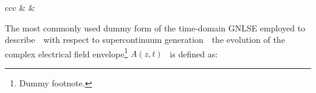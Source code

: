 \documentclass[../main.tex]{subfiles}
\begin{document}
{\begin{table}[ht]
{\begin{tabular}{ccc}
   &  & \\ \hline \hline
\end{tabular}%
}
\end{table}
}

The most commonly used dummy form of the time-domain GNLSE employed to describe~\textendash~with respect to supercontinuum generation~\textendash~the evolution of the complex electrical field envelope\footnote{Dummy footnote.} $A(z,t)$~\cite{Zorin:22} is defined as:
\end{document}
